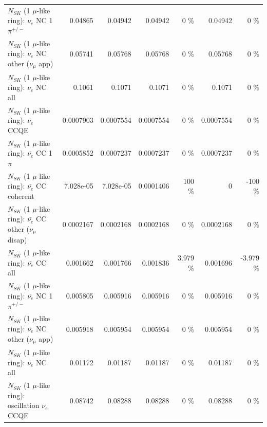 \begin{table}
\begin{tabular}{| l | r | r | r  r | r  r |}
\hline
                           $N_{SK}$ (1 $\mu$-like ring): $\nu_e$ NC 1$\pi^{+/-}$ &         0.04865 &         0.04942 &         0.04942 &        0 \%  &         0.04942 &        0 \%  \\ 
                  $N_{SK}$ (1 $\mu$-like ring): $\nu_e$ NC other ($\nu_\mu$ app) &         0.05741 &         0.05768 &         0.05768 &        0 \%  &         0.05768 &        0 \%  \\ 
                                  $N_{SK}$ (1 $\mu$-like ring): $\nu_{e}$ NC all &          0.1061 &          0.1071 &          0.1071 &        0 \%  &          0.1071 &        0 \%  \\ 
\hline
\hline
\hline
                                $N_{SK}$ (1 $\mu$-like ring): $\bar{\nu_e}$ CCQE &       0.0007903 &       0.0007554 &       0.0007554 &        0 \%  &       0.0007554 &        0 \%  \\ 
                           $N_{SK}$ (1 $\mu$-like ring): $\bar{\nu_e}$ CC 1$\pi$ &       0.0005852 &       0.0007237 &       0.0007237 &        0 \%  &       0.0007237 &        0 \%  \\ 
                         $N_{SK}$ (1 $\mu$-like ring): $\bar{\nu_e}$ CC coherent &       7.028e-05 &       7.028e-05 &       0.0001406 &      100 \%  &               0 &     -100 \%  \\ 
          $N_{SK}$ (1 $\mu$-like ring): $\bar{\nu_e}$ CC other ($\nu_\mu$ disap) &       0.0002167 &       0.0002168 &       0.0002168 &        0 \%  &       0.0002168 &        0 \%  \\ 
                            $N_{SK}$ (1 $\mu$-like ring): $\bar{\nu_{e}}$ CC all &        0.001662 &        0.001766 &        0.001836 &    3.979 \%  &        0.001696 &   -3.979 \%  \\ 
\hline
                     $N_{SK}$ (1 $\mu$-like ring): $\bar{\nu_e}$ NC 1$\pi^{+/-}$ &        0.005805 &        0.005916 &        0.005916 &        0 \%  &        0.005916 &        0 \%  \\ 
            $N_{SK}$ (1 $\mu$-like ring): $\bar{\nu_e}$ NC other ($\nu_\mu$ app) &        0.005918 &        0.005954 &        0.005954 &        0 \%  &        0.005954 &        0 \%  \\ 
                            $N_{SK}$ (1 $\mu$-like ring): $\bar{\nu_{e}}$ NC all &         0.01172 &         0.01187 &         0.01187 &        0 \%  &         0.01187 &        0 \%  \\ 
\hline
\hline
\hline
                          $N_{SK}$ (1 $\mu$-like ring): oscillation $\nu_e$ CCQE &         0.08742 &         0.08288 &         0.08288 &        0 \%  &         0.08288 &        0 \%  \\ 

\end{tabular}
\end{table}
